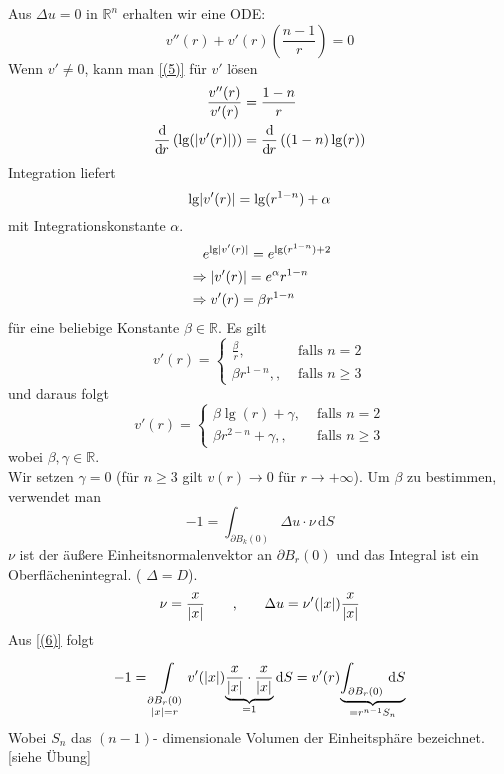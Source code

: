 Aus $\Delta u = 0$ in $\mathbb{R}^n$ erhalten wir eine ODE:
\begin{equation}
	v''(r) + v'(r)\left( \frac{n-1}{r} \right) = 0  \label{(5)}
\end{equation}
Wenn $v' \neq 0$, kann man \eqref{(5)} für $v'$ lösen
\begin{align}
	\frac{v''(r)}{v'(r)} &= \frac{1-n}{r} \\
	\frac{\mathrm{d}\mkern-1.0mu }{\mathrm{d}\mkern-1.0mu r} \left( \lg(\lvert v'(r)\rvert) \right) &= \frac{\mathrm{d}\mkern-1.0mu }{\mathrm{d}\mkern-1.0mu r}  \left( (1-n) \lg(r) \right)
\end{align}
Integration liefert 
\begin{equation}
	\lg \lvert v'(r)\rvert = \lg( r ^{1-n}) + \alpha
\end{equation}
mit Integrationskonstante $\alpha$.
\begin{align*}
	&\hphantom{\Rightarrow} e^{\lg \lvert v'(r)\rvert} = e^{\lg(r^{1-n})+2} \\
	&\Rightarrow \lvert v'(r)\rvert = e^{\alpha} r^{1-n} \\
	&\Rightarrow v'(r) = \beta r^{1-n}
\end{align*}
für eine beliebige Konstante $\beta \in \mathbb{R}$. Es gilt
\begin{equation}
	v'(r) = \begin{cases}
		\frac{\beta}{r}, &\text{ falls } n = 2\\
		\beta r^{1-n}, , &\text{ falls } n \geq 3		
	\end{cases}
\end{equation}
und daraus folgt
\begin{equation}
	v'(r) = \begin{cases}
		\beta \lg(r)+ \gamma, &\text{ falls } n = 2\\
		\beta r^{2-n} + \gamma, , &\text{ falls } n \geq 3		
	\end{cases}
\end{equation}
wobei $\beta,\gamma \in \mathbb{R}$. \\
Wir setzen $ \gamma = 0$ (für $n \geq 3$ gilt $v(r) \to 0$ für $r \to +\infty$). Um $\beta$ zu bestimmen, verwendet man 
\begin{equation}
	-1 = \int_{\partial B_k(0)}^{} \Delta u \cdot \nu \,\mathrm{d}S \label{(6)}
\end{equation}
$\nu$ ist der äußere Einheitsnormalenvektor an $\partial B_r(0)$ und das Integral ist ein Oberflächenintegral. ( $ \Delta = D$). \\
\[
	\nu = \frac{x}{\lvert x\rvert} \qquad \text{,} \qquad \Delta u = \nu'(\lvert x\rvert) \frac{x}{\lvert x\rvert}
\]
Aus \eqref{(6)} folgt 
\begin{equation}
	-1 = \int\limits_{\substack{\partial B_r(0)\\ \lvert x\rvert=r}}^{} v'(\lvert x\rvert) \underset{=1}{\underbrace{\frac{x}{\lvert x\rvert} \cdot \frac{x}{\lvert x\rvert}}} \,\mathrm{d}S  
	= v'(r) \underset{= r^{n-1}S_n}{\underbrace{\int_{\partial B_r(0)}^{} \,\mathrm{d}S }}
\end{equation}
Wobei $S_n$ das $(n-1)$- dimensionale Volumen der Einheitsphäre bezeichnet. [siehe Übung]


